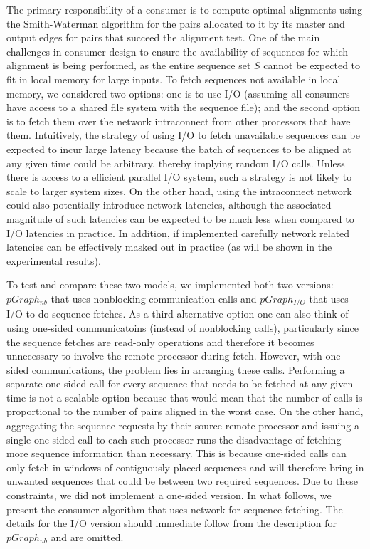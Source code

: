 \documentclass[10pt,journal,letterpaper,compsoc]{IEEEtran}
\begin{document}
The primary responsibility of a consumer is to compute optimal alignments using the Smith-Waterman algorithm \cite{Smith81} for the pairs allocated to it by its master and output edges for pairs that succeed the alignment test. One of the main challenges in consumer design to ensure the availability of sequences for which alignment is being performed, as the entire sequence set $S$ cannot be expected to fit in local memory for large inputs. To fetch sequences not available in local memory, we considered two options: one is to use I/O (assuming all consumers have access to a shared file system with the sequence file); and the second option is to fetch them over the network intraconnect from other processors that have them. Intuitively, the strategy of using I/O to fetch unavailable sequences can be expected to incur large latency because the batch of sequences to be aligned at any given time could be arbitrary, thereby implying random I/O calls. Unless there is access to a efficient parallel I/O system, such a strategy is not likely to scale to larger system sizes. On the other hand, using the intraconnect network could also potentially introduce network latencies, although the associated magnitude of such latencies can be expected to be much less when compared to I/O latencies in practice. In addition, if implemented carefully network related latencies can be effectively masked out in practice (as will be shown in the experimental results). 

To test and compare these two models, we implemented both two versions: $pGraph_{nb}$ that uses nonblocking communication calls and $pGraph_{I/O}$ that uses I/O to do sequence fetches. As a third alternative option one can also think of using one-sided communicatoins (instead of nonblocking calls), particularly since the sequence fetches are read-only operations and therefore it becomes unnecessary to involve the remote processor during fetch. However, with one-sided communications, the problem lies in arranging these calls. Performing a separate one-sided call for every sequence that needs to be fetched at any given time is not a scalable option because that would mean that the number of calls is proportional to the number of pairs aligned in the worst case. On the other hand, aggregating the sequence requests by their source remote processor and issuing a single one-sided call to each such processor runs the disadvantage of fetching more sequence information than necessary. This is because one-sided calls can only fetch in windows of contiguously placed sequences and will therefore bring in unwanted sequences that could be between two required sequences. Due to these constraints, we did not implement a one-sided version. In what follows, we present the consumer algorithm that uses network for sequence fetching. The details for the I/O version should immediate follow from the description for $pGraph_{nb}$ and are omitted. 
\end{document}
